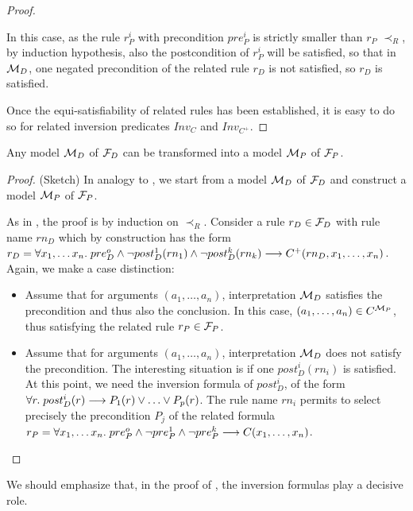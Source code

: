 \begin{proof}
\begin{itemize}
    In this case, as the rule $r_P^i$ with precondition $pre_P^i$ is strictly
    smaller than $r_P$ \wrt{} $\prec_R$, by induction hypothesis, also the
    postcondition of $r_P^i$ will be satisfied, so that in ${\cal M}_D$, one
    negated precondition of the related rule $r_D$ is not satisfied, so $r_D$
    is satisfied.
  \end{itemize}

  Once the equi-satisfiability of related rules has been established, it is
  easy to do so for related inversion predicates $Inv_C$ and $Inv_{C^+}$.
\end{proof}


\begin{lemma}\label{lemma:md_to_mp}
  Any model ${\cal M}_D$ of ${\cal F}_D$ can be transformed into a model
  ${\cal M}_P$ of ${\cal F}_P$.
\end{lemma}

\begin{proof} (Sketch)
  In analogy to , we start from a model ${\cal M}_D$
  of ${\cal F}_D$ and construct a model ${\cal M}_P$ of ${\cal F}_P$. 

  As in , the proof is by induction on $\prec_R$.
  Consider a rule $r_D \in {\cal F}_D$ with rule
  name $rn_D$ which by construction has the form
  $r_D = \forall x_1, \dots x_n.\; pre_D^o \land \lnot post_D^1(rn_1) \land \lnot post_D^k(rn_k)
  \longrightarrow C^+(rn_D, x_1, \dots, x_n)$. Again, we make a case distinction:
  \begin{itemize}
  \item Assume that for arguments $(a_1, \dots, a_n)$, interpretation
    ${\cal M}_D$ satisfies the precondition and thus also the conclusion. In
    this case, $(a_1, \dots, a_n)\in C^{{\cal M}_P}$, thus satisfying the
    related rule $r_P \in {\cal F}_P$.
  \item Assume that for arguments $(a_1, \dots, a_n)$, interpretation
    ${\cal M}_D$ does not satisfy the precondition. The interesting situation
    is if one $post_D^i(rn_i)$ is satisfied. At this point, we need the
    inversion formula of $post_D^i$, of the form
    $\forall r.\; post_D^i(r) \IMPL P_1(r) \OR \dots \OR P_p(r)$. The rule
    name $rn_i$ permits to select precisely the precondition $P_j$ of the
    related formula
    $r_P = \forall x_1, \dots x_n.\; pre_P^o \land \lnot pre_P^1 \land \lnot
    pre_P^k \longrightarrow C(x_1, \dots, x_n)$.
  \end{itemize}
\end{proof}
We should emphasize that, in the proof of , the
inversion formulas play a decisive role.





